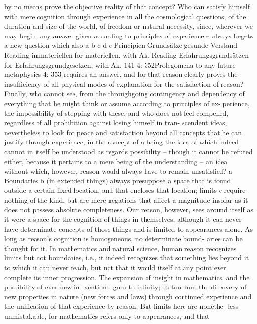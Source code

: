 by no means prove the objective reality of that concept? Who can satisfy
himself with mere cognition through experience in all the cosmological
questions, of the duration and size of the world, of freedom or natural
necessity, since, wherever we may begin, any answer given according
to principles of experience e always begets a new question which also
a
b
c
d
e
Principien
Grundsätze
gesunde Verstand
Reading immateriellen for materiellen, with Ak.
Reading Erfahrungsgrundsätzen for Erfahrungsgrundgesetzen, with Ak.
141
4: 352Prolegomena to any future metaphysics
4: 353
requires an answer, and for that reason clearly proves the insufﬁciency
of all physical modes of explanation for the satisfaction of reason? Finally,
who cannot see, from the throughgoing contingency and dependency of
everything that he might think or assume according to principles of ex-
perience, the impossibility of stopping with these, and who does not feel
compelled, regardless of all prohibition against losing himself in tran-
scendent ideas, nevertheless to look for peace and satisfaction beyond
all concepts that he can justify through experience, in the concept of a
being the idea of which indeed cannot in itself be understood as regards
possibility – though it cannot be refuted either, because it pertains to
a mere being of the understanding – an idea without which, however,
reason would always have to remain unsatisﬁed? a
Boundaries b (in extended things) always presuppose a space that is
found outside a certain ﬁxed location, and that encloses that location;
limits c require nothing of the kind, but are mere negations that affect
a magnitude insofar as it does not possess absolute completeness. Our
reason, however, sees around itself as it were a space for the cognition of
things in themselves, although it can never have determinate concepts
of those things and is limited to appearances alone.
As long as reason’s cognition is homogeneous, no determinate bound-
aries can be thought for it. In mathematics and natural science, human
reason recognizes limits but not boundaries, i.e., it indeed recognizes
that something lies beyond it to which it can never reach, but not that
it would itself at any point ever complete its inner progression. The
expansion of insight in mathematics, and the possibility of ever-new in-
ventions, goes to inﬁnity; so too does the discovery of new properties
in nature (new forces and laws) through continued experience and the
uniﬁcation of that experience by reason. But limits here are nonethe-
less unmistakable, for mathematics refers only to appearances, and that
